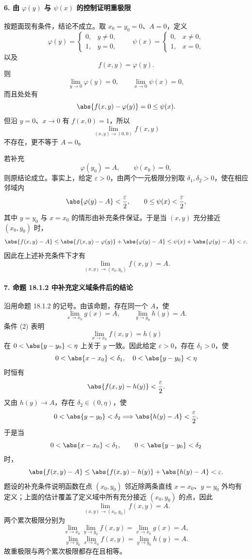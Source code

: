 \paragraph{6. 由 $\varphi(y)$ 与 $\psi(x)$ 的控制证明重极限}
\begin{xsolution}
按题面现有条件，结论不成立。取 $x_0=y_0=0$、$A=0$，定义
\[
  \varphi(y)=
  \begin{cases}
    0, & y\ne0,\\
    1, & y=0,
  \end{cases}
  \qquad
  \psi(x)=
  \begin{cases}
    0, & x\ne0,\\
    1, & x=0,
  \end{cases}
\]
以及
\[
  f(x,y)=\varphi(y).
\]
则
\[
  \lim_{y\to0}\varphi(y)=0,
  \qquad
  \lim_{x\to0}\psi(x)=0,
\]
而且处处有
\[
  \abs{f(x,y)-\varphi(y)}=0\le\psi(x).
\]
但沿 $y=0$、$x\to0$ 有 $f(x,0)=1$，所以
\[
  \lim_{(x,y)\to(0,0)}f(x,y)
\]
不存在，更不等于 $A=0$。

若补充
\[
  \varphi(y_0)=A,
  \qquad
  \psi(x_0)=0,
\]
则原结论成立。事实上，给定 $\varepsilon>0$，由两个一元极限分别取 $\delta_1,\delta_2>0$，使在相应邻域内
\[
  \abs{\varphi(y)-A}<\frac\varepsilon2,
  \qquad
  0\le\psi(x)<\frac\varepsilon2,
\]
其中 $y=y_0$ 与 $x=x_0$ 的情形由补充条件保证。于是当 $(x,y)$ 充分接近 $(x_0,y_0)$ 时，
\[
  \abs{f(x,y)-A}
  \le\abs{f(x,y)-\varphi(y)}+\abs{\varphi(y)-A}
  \le\psi(x)+\abs{\varphi(y)-A}
  <\varepsilon.
\]
因此在上述补充条件下才有
\[
  \lim_{(x,y)\to(x_0,y_0)}f(x,y)=A.
\]
\end{xsolution}

\paragraph{7. 命题 18.1.2 中补充定义域条件后的结论}
\begin{xsolution}
沿用命题 18.1.2 的记号。由该命题，存在同一个 $A$，使
\[
  \lim_{x\to x_0}g(x)=A,
  \qquad
  \lim_{y\to y_0}h(y)=A.
\]
条件 (2) 表明
\[
  \lim_{x\to x_0}f(x,y)=h(y)
\]
在 $0<\abs{y-y_0}<\eta$ 上关于 $y$ 一致。因此给定 $\varepsilon>0$，存在 $\delta_1>0$，使
\[
  0<\abs{x-x_0}<\delta_1,
  \quad
  0<\abs{y-y_0}<\eta
\]
时恒有
\[
  \abs{f(x,y)-h(y)}<\frac\varepsilon2.
\]
又由 $h(y)\to A$，存在 $\delta_2\in(0,\eta)$，使
\[
  0<\abs{y-y_0}<\delta_2
  \Longrightarrow
  \abs{h(y)-A}<\frac\varepsilon2.
\]
于是当
\[
  0<\abs{x-x_0}<\delta_1,
  \qquad
  0<\abs{y-y_0}<\delta_2
\]
时，
\[
  \abs{f(x,y)-A}
  \le\abs{f(x,y)-h(y)}+\abs{h(y)-A}
  <\varepsilon.
\]
题设的补充条件说明函数在点 $(x_0,y_0)$ 邻近除两条直线 $x=x_0$、$y=y_0$ 外均有定义；上面的估计覆盖了定义域中所有充分接近 $(x_0,y_0)$ 的点，因此
\[
  \lim_{(x,y)\to(x_0,y_0)}f(x,y)=A.
\]
两个累次极限分别为
\[
  \lim_{x\to x_0}\lim_{y\to y_0}f(x,y)
  =\lim_{x\to x_0}g(x)=A,
\]
\[
  \lim_{y\to y_0}\lim_{x\to x_0}f(x,y)
  =\lim_{y\to y_0}h(y)=A.
\]
故重极限与两个累次极限都存在且相等。
\end{xsolution}

